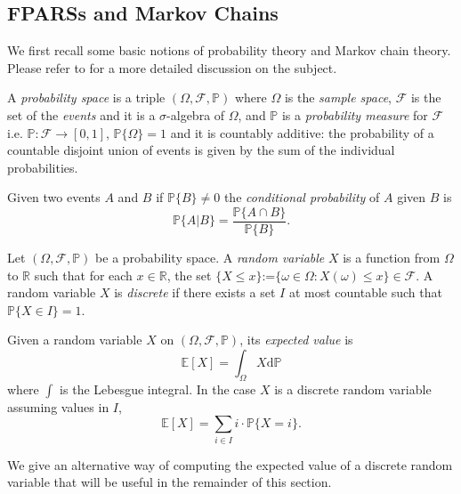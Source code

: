 \begin{LONG}
	\section{FPARSs and Markov Chains}
	We first recall some basic notions of probability theory and Markov chain theory. Please refer to \cite{ash_probability_1999,norris_markov_1998} for a more detailed discussion on the subject.
	\begin{definition}
		A \emph{probability space} is a triple $(\Omega, \mathcal{F},\mathbb{P})$ where $\Omega$ is the \emph{sample space}, $\mathcal{F}$ is the set of the \emph{events} and it is a $\sigma$-algebra of $\Omega$, and $\mathbb{P}$ is a \emph{probability measure} for $\mathcal{F}$ i.e. $\mathbb{P} :\mathcal{F}\rightarrow[0,1]$, $\mathbb{P}\{\Omega\}=1$ and it is countably additive: the probability of a countable disjoint union of events is given by the sum of the individual probabilities.
	\end{definition}
	\begin{definition}
		Given two events $A$ and $B$ if $\mathbb{P}\{B\}\neq 0$ the \emph{conditional probability} of $A$ given $B$ is
		$$
		\mathbb{P}\{A|B\}=\frac{\mathbb{P}\{A\cap B\}}{\mathbb{P}\{B\}}.
		$$
	\end{definition}
	\begin{definition}
		Let $(\Omega, \mathcal{F},\mathbb{P})$ be a probability space. A \emph{random variable} $X$ is a function from $\Omega$ to $\mathbb{R}$ such that for each $x\in \mathbb{R}$, the set $\{X\leq x\}$:=$\{\omega\in\Omega : X(\omega)\leq x\}\in \mathcal{F}$. A random variable $X$ is \emph{discrete} if there exists a set $I$ at most countable such that $\mathbb{P}\{X\in I\}=1$.
	\end{definition} 
	\begin{definition}
		Given a random variable $X$ on $(\Omega, \mathcal{F},\mathbb{P})$, its \emph{expected value} is
		$$
		\mathbb{E}[X]=\int_{\Omega}X\mathrm{d}\mathbb{P}
		$$
		where $\int$ is the Lebesgue integral. In the case $X$ is a discrete random variable assuming values in $I$,
		$$
		\mathbb{E}[X]=\sum_{i\in I}i\cdot\mathbb{P}\{X=i\}.
		$$
	\end{definition}
	We give an alternative way of computing the expected value of a discrete random variable that will be useful in the remainder of this section.
	\begin{proposition}\label{prop:alt-def}

\end{proposition}
\end{LONG}
